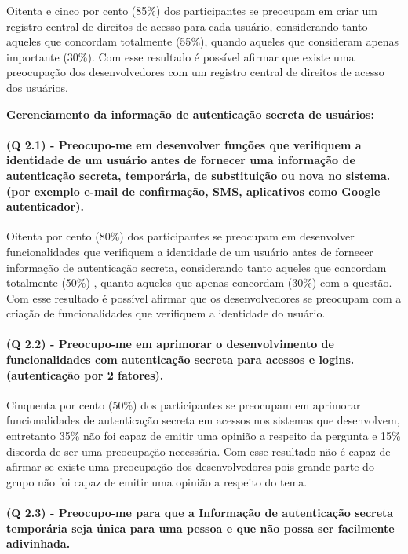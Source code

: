 Oitenta e cinco por cento (85{\%}) dos participantes se preocupam em criar um registro central de direitos de acesso para cada usuário, considerando tanto aqueles que concordam totalmente (55{\%}), quando aqueles que consideram apenas importante (30{\%}). Com esse resultado é possível afirmar que existe uma preocupação dos desenvolvedores com um registro central de direitos de acesso dos usuários.

\vspace{0.5cm}
\noindent\textbf{Gerenciamento da informação de autenticação secreta de usuários:}

\paragraph{\textbf{(Q 2.1)} - Preocupo-me em desenvolver funções que verifiquem a identidade de um usuário antes de fornecer uma informação de autenticação secreta, temporária, de substituição ou nova no sistema. (por exemplo e-mail de confirmação, SMS, aplicativos como Google autenticador).}

Oitenta por cento (80{\%}) dos participantes se preocupam em desenvolver funcionalidades que verifiquem a identidade de um usuário antes de fornecer informação de autenticação secreta, considerando tanto aqueles que concordam totalmente (50{\%}) , quanto aqueles que apenas concordam (30{\%}) com a questão. Com esse resultado é possível afirmar que os desenvolvedores se preocupam com a criação de funcionalidades que verifiquem a identidade do usuário.

\paragraph{\textbf{(Q 2.2)} - Preocupo-me em aprimorar o desenvolvimento de funcionalidades com autenticação secreta para acessos e logins. (autenticação por 2 fatores).}

Cinquenta por cento (50{\%}) dos participantes se preocupam em aprimorar funcionalidades de autenticação secreta em acessos nos sistemas que desenvolvem, entretanto 35{\%} não foi capaz de emitir uma opinião a respeito da pergunta e 15{\%} discorda de ser uma preocupação necessária. Com esse resultado não é capaz de afirmar se existe uma preocupação dos desenvolvedores pois grande parte do grupo não foi capaz de emitir uma opinião a respeito do tema.

\paragraph{\textbf{(Q 2.3)} - Preocupo-me para que a Informação de autenticação secreta temporária seja única para uma pessoa e que não possa ser facilmente adivinhada.}

